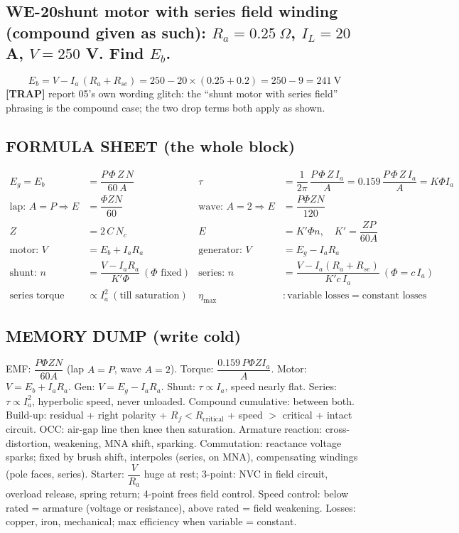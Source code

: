 \documentclass[11pt]{article}
\newcommand{\q}[2]{\subsection*{\color{copper}#1\quad\color{iron}#2}}
\newcommand{\tr}[1]{\textbf{\color{red}[TRAP]} #1}
\begin{document}
\q{WE-20}{shunt motor with series field winding (compound given as such): $R_a = 0.25\ \Omega$, $I_L = 20$ A, $V = 250$ V. Find $E_b$.}
\[
E_b = V - I_a\, (R_a + R_{se}) = 250 - 20 \times (0.25 + 0.2) = 250 - 9 = 241\ \text{V}
\]
\tr{report 05's own wording glitch: the ``shunt motor with series field'' phrasing is the compound case; the two drop terms both apply as shown.}

\hrulefill
\subsection*{\color{copper}FORMULA SHEET (the whole block)}
\begin{align*}
E_g = E_b &= \dfrac{P\,\Phi\, Z\, N}{60\, A}
& \tau &= \dfrac{1}{2\pi}\,\dfrac{P\,\Phi\, Z\, I_a}{A} = 0.159\,\dfrac{P\,\Phi\, Z\, I_a}{A} = K \Phi I_a \\[4pt]
\text{lap: } A = P \Rightarrow E &= \dfrac{\Phi Z N}{60}
& \text{wave: } A = 2 \Rightarrow E &= \dfrac{P \Phi Z N}{120} \\[4pt]
Z &= 2\, C\, N_c
& E &= K' \Phi n,\quad K' = \dfrac{ZP}{60A} \\[4pt]
\text{motor: } V &= E_b + I_a R_a
& \text{generator: } V &= E_g - I_a R_a \\[4pt]
\text{shunt: } n &= \dfrac{V - I_a R_a}{K' \Phi}\ (\Phi \text{ fixed})
& \text{series: } n &= \dfrac{V - I_a (R_a + R_{se})}{K' c\, I_a}\ (\Phi = c\, I_a) \\[4pt]
\text{series torque} &\propto I_a^2 \ (\text{till saturation})
& \eta_{\text{max}} &: \text{variable losses} = \text{constant losses}
\end{align*}

\subsection*{\color{copper}MEMORY DUMP (write cold)}
EMF: $\dfrac{P \Phi Z N}{60 A}$ (lap $A = P$, wave $A = 2$). Torque: $\dfrac{0.159\, P \Phi Z I_a}{A}$. Motor: $V = E_b + I_a R_a$. Gen: $V = E_g - I_a R_a$. Shunt: $\tau \propto I_a$, speed nearly flat. Series: $\tau \propto I_a^{2}$, hyperbolic speed, never unloaded. Compound cumulative: between both. Build-up: residual + right polarity + $R_f < R_{\text{critical}}$ + speed $>$ critical + intact circuit. OCC: air-gap line then knee then saturation. Armature reaction: cross-distortion, weakening, MNA shift, sparking. Commutation: reactance voltage sparks; fixed by brush shift, interpoles (series, on MNA), compensating windings (pole faces, series). Starter: $\dfrac{V}{R_a}$ huge at rest; 3-point: NVC in field circuit, overload release, spring return; 4-point frees field control. Speed control: below rated = armature (voltage or resistance), above rated = field weakening. Losses: copper, iron, mechanical; max efficiency when variable = constant.
\end{document}
